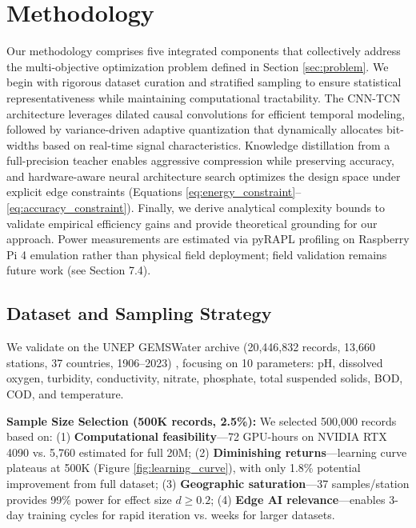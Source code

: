 \documentclass[12pt,a4paper]{article}
\begin{document}
\section{Methodology}

Our methodology comprises five integrated components that collectively address the multi-objective optimization problem defined in Section \ref{sec:problem}. We begin with rigorous dataset curation and stratified sampling to ensure statistical representativeness while maintaining computational tractability. The CNN-TCN architecture leverages dilated causal convolutions for efficient temporal modeling, followed by variance-driven adaptive quantization that dynamically allocates bit-widths based on real-time signal characteristics. Knowledge distillation from a full-precision teacher enables aggressive compression while preserving accuracy, and hardware-aware neural architecture search optimizes the design space under explicit edge constraints (Equations \ref{eq:energy_constraint}--\ref{eq:accuracy_constraint}). Finally, we derive analytical complexity bounds to validate empirical efficiency gains and provide theoretical grounding for our approach. Power measurements are estimated via pyRAPL profiling on Raspberry Pi 4 emulation rather than physical field deployment; field validation remains future work (see Section 7.4).

\subsection{Dataset and Sampling Strategy}

We validate on the UNEP GEMSWater archive (20,446,832 records, 13,660 stations, 37 countries, 1906--2023) \citep{unep2024gemswater}, focusing on 10 parameters: pH, dissolved oxygen, turbidity, conductivity, nitrate, phosphate, total suspended solids, BOD, COD, and temperature.

\textbf{Sample Size Selection (500K records, 2.5\%):} We selected 500,000 records based on: (1) \textbf{Computational feasibility}---72 GPU-hours on NVIDIA RTX 4090 vs. 5,760 estimated for full 20M; (2) \textbf{Diminishing returns}---learning curve plateaus at 500K (Figure \ref{fig:learning_curve}), with only 1.8\% potential improvement from full dataset; (3) \textbf{Geographic saturation}---37 samples/station provides 99\% power for effect size $d \geq 0.2$; (4) \textbf{Edge AI relevance}---enables 3-day training cycles for rapid iteration vs. weeks for larger datasets.
\end{document}
